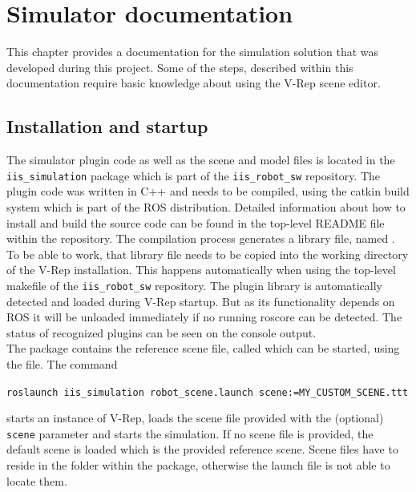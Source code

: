 
\chapter{Simulator documentation}
\label{app:sim_doc}

This chapter provides a documentation for the simulation solution that was developed during this project. 
Some of the steps, described within this documentation require basic knowledge about using the V-Rep scene editor.


\section{Installation and startup}

The simulator plugin code as well as the scene and model files is located in the \texttt{iis\_simulation} package which is part of the \texttt{iis\_robot\_sw} repository. The plugin code was written in C++ and needs to be compiled, using the catkin build system which is part of the ROS distribution. Detailed information about how to install and build the source code can be found in the top-level README file within the repository. The compilation process generates a library file, named . To be able to work, that library file needs to be copied into the working directory of the V-Rep installation. This happens automatically when using the top-level makefile of the \texttt{iis\_robot\_sw} repository. The plugin library is automatically detected and loaded during V-Rep startup. But as its functionality depends on ROS it will be unloaded immediately if no running roscore can be detected. The status of recognized plugins can be seen on the console output. \\

The package contains the reference scene file, called  which can be started, using the  file. The command
\begin{center}
\texttt{roslaunch iis\_simulation robot\_scene.launch scene:=MY\_CUSTOM\_SCENE.ttt}
\end{center}
starts an instance of V-Rep, loads the scene file provided with the (optional) \texttt{scene} parameter and starts the simulation. If no scene file is provided, the default scene is loaded which is the provided reference scene. Scene files have to reside in the  folder within the package, otherwise the launch file is not able to locate them.

